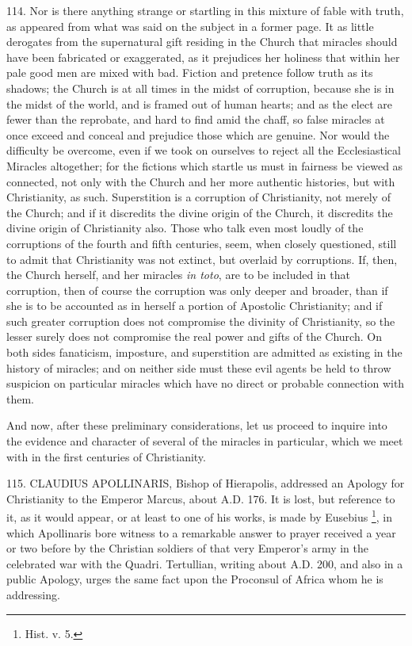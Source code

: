 114.
Nor is there anything strange or startling in this mixture of fable
with truth, as appeared from what was said on the subject in a former
page. It as little derogates from the supernatural gift residing in
the Church that miracles should have been fabricated or exaggerated,
as it prejudices her holiness that within her pale good men are mixed
with bad. Fiction and pretence follow truth as its shadows; the
Church is at all times in the midst of corruption, because she is in
the midst of the world, and is framed out of human hearts; and as the
elect are fewer than the reprobate, and hard to find amid the chaff,
so false miracles at once exceed and conceal and prejudice those which
are genuine. Nor would the difficulty be overcome, even if we took on
ourselves to reject all the Ecclesiastical Miracles altogether; for
the fictions which startle us must in fairness be viewed as connected,
not only with the Church and her more authentic histories, but with
Christianity, as such. Superstition is a corruption of Christianity,
not merely of the Church; and if it discredits the divine origin of
the Church, it discredits the divine origin of Christianity also.
Those who talk even most loudly of the corruptions of the fourth and
fifth centuries, seem, when closely questioned, still to admit that
Christianity was not extinct, but overlaid by corruptions. If, then,
the Church herself, and her miracles \emph{in toto}, are to be
included in that corruption, then of course the corruption was only
deeper and broader, than if she is to be accounted as in herself a
portion of Apostolic Christianity; and if such greater corruption does
not compromise the divinity of Christianity, so the lesser surely does
not compromise the real power and gifts of the Church. On both sides
fanaticism, imposture, and superstition are admitted as existing in the history of miracles; and on neither side must these evil agents
be held to throw suspicion on particular miracles which have no direct
or probable connection with them.

And now, after these preliminary considerations,
let us proceed to inquire into the evidence and character of several
of the miracles in particular, which we meet with in the first
centuries of Christianity.


115.
CLAUDIUS APOLLINARIS,
Bishop of Hierapolis, addressed an Apology for Christianity to the
Emperor Marcus, about A.D. 176.
It is lost, but reference to it, as it would appear, or at least to
one of his works, is made by Eusebius \footnote{Hist. v. 5.}, in which Apollinaris bore witness to a remarkable answer to
prayer received a year or two before by the Christian soldiers of that
very Emperor's army in the celebrated war with the Quadri. Tertullian,
writing about A.D. 200, and also
in a public Apology, urges the same fact upon the Proconsul of Africa
whom he is addressing.

